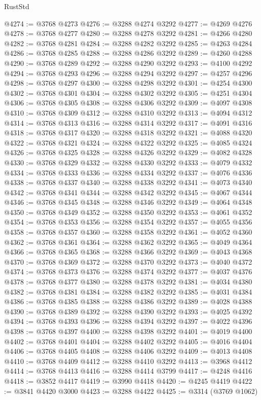 \begin{lexlean}{RustStd}
\begin{coremodule}
@4274 := @3768 @4273
@4276 := @3288 @4274 @3292
@4277 := @4269 @4276
@4278 := @3768 @4277
@4280 := @3288 @4278 @3292
@4281 := @4266 @4280
@4282 := @3768 @4281
@4284 := @3288 @4282 @3292
@4285 := @4263 @4284
@4286 := @3768 @4285
@4288 := @3288 @4286 @3292
@4289 := @4260 @4288
@4290 := @3768 @4289
@4292 := @3288 @4290 @3292
@4293 := @4100 @4292
@4294 := @3768 @4293
@4296 := @3288 @4294 @3292
@4297 := @4257 @4296
@4298 := @3768 @4297
@4300 := @3288 @4298 @3292
@4301 := @4254 @4300
@4302 := @3768 @4301
@4304 := @3288 @4302 @3292
@4305 := @4251 @4304
@4306 := @3768 @4305
@4308 := @3288 @4306 @3292
@4309 := @4097 @4308
@4310 := @3768 @4309
@4312 := @3288 @4310 @3292
@4313 := @4094 @4312
@4314 := @3768 @4313
@4316 := @3288 @4314 @3292
@4317 := @4091 @4316
@4318 := @3768 @4317
@4320 := @3288 @4318 @3292
@4321 := @4088 @4320
@4322 := @3768 @4321
@4324 := @3288 @4322 @3292
@4325 := @4085 @4324
@4326 := @3768 @4325
@4328 := @3288 @4326 @3292
@4329 := @4082 @4328
@4330 := @3768 @4329
@4332 := @3288 @4330 @3292
@4333 := @4079 @4332
@4334 := @3768 @4333
@4336 := @3288 @4334 @3292
@4337 := @4076 @4336
@4338 := @3768 @4337
@4340 := @3288 @4338 @3292
@4341 := @4073 @4340
@4342 := @3768 @4341
@4344 := @3288 @4342 @3292
@4345 := @4067 @4344
@4346 := @3768 @4345
@4348 := @3288 @4346 @3292
@4349 := @4064 @4348
@4350 := @3768 @4349
@4352 := @3288 @4350 @3292
@4353 := @4061 @4352
@4354 := @3768 @4353
@4356 := @3288 @4354 @3292
@4357 := @4055 @4356
@4358 := @3768 @4357
@4360 := @3288 @4358 @3292
@4361 := @4052 @4360
@4362 := @3768 @4361
@4364 := @3288 @4362 @3292
@4365 := @4049 @4364
@4366 := @3768 @4365
@4368 := @3288 @4366 @3292
@4369 := @4043 @4368
@4370 := @3768 @4369
@4372 := @3288 @4370 @3292
@4373 := @4040 @4372
@4374 := @3768 @4373
@4376 := @3288 @4374 @3292
@4377 := @4037 @4376
@4378 := @3768 @4377
@4380 := @3288 @4378 @3292
@4381 := @4034 @4380
@4382 := @3768 @4381
@4384 := @3288 @4382 @3292
@4385 := @4031 @4384
@4386 := @3768 @4385
@4388 := @3288 @4386 @3292
@4389 := @4028 @4388
@4390 := @3768 @4389
@4392 := @3288 @4390 @3292
@4393 := @4025 @4392
@4394 := @3768 @4393
@4396 := @3288 @4394 @3292
@4397 := @4022 @4396
@4398 := @3768 @4397
@4400 := @3288 @4398 @3292
@4401 := @4019 @4400
@4402 := @3768 @4401
@4404 := @3288 @4402 @3292
@4405 := @4016 @4404
@4406 := @3768 @4405
@4408 := @3288 @4406 @3292
@4409 := @4013 @4408
@4410 := @3768 @4409
@4412 := @3288 @4410 @3292
@4413 := @3968 @4412
@4414 := @3768 @4413
@4416 := @3288 @4414 @3799
@4417 := @4248 @4416
@4418 := @3852 @4417
@4419 := @3990 @4418
@4420 := @4245 @4419
@4422 := @3841 @4420 @3000
@4423 := @3288 @4422
@4425 := @3314 (@3769 @1062)

\end{coremodule}
\end{lexlean}
